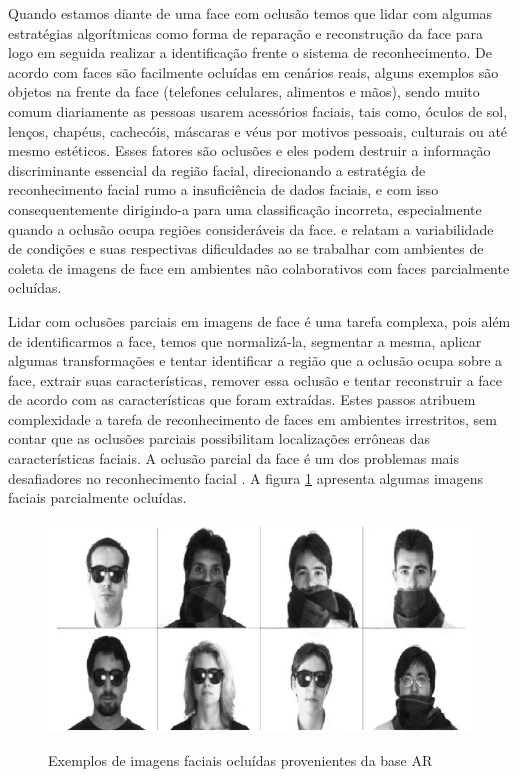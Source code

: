 Quando estamos diante de uma face com oclusão temos que lidar com algumas estratégias algorítmicas como forma de reparação e reconstrução da face para logo em seguida realizar a identificação frente o sistema de reconhecimento. De acordo com  faces são facilmente ocluídas em cenários reais, alguns exemplos são objetos na frente da face (telefones celulares, alimentos e mãos), sendo muito comum diariamente  as pessoas usarem acessórios faciais, tais como, óculos de sol, lenços, chapéus, cachecóis, máscaras e véus por motivos pessoais, culturais ou até mesmo estéticos. Esses fatores são oclusões e eles podem destruir a informação discriminante  essencial da região facial, direcionando a estratégia de reconhecimento facial rumo a insuficiência de dados faciais, e com isso consequentemente dirigindo-a para uma classificação incorreta, especialmente quando a oclusão ocupa regiões consideráveis da face. 
  e  relatam a variabilidade de condições e suas respectivas dificuldades ao se trabalhar com ambientes de coleta de imagens de face em ambientes não colaborativos com faces parcialmente ocluídas.

Lidar com oclusões parciais em imagens de face é uma tarefa complexa, pois além de identificarmos a face, temos que normalizá-la,  segmentar a mesma, aplicar algumas transformações e tentar identificar a região que a oclusão ocupa sobre a face, extrair suas características, remover essa oclusão e tentar reconstruir a face de acordo com as características que foram extraídas. Estes passos atribuem complexidade a tarefa de reconhecimento de faces em ambientes irrestritos, sem contar que as oclusões parciais possibilitam localizações errôneas das características faciais. A oclusão parcial da face é um dos problemas mais desafiadores no reconhecimento facial \cite{ekenel2009facial}. A figura \ref{fig:imgsOcluidas} apresenta algumas imagens faciais parcialmente ocluídas.

\begin{figure}[H]
\centering
\caption{Exemplos de imagens faciais ocluídas provenientes da base AR}
\includegraphics[scale = 0.8]{imgs/imgsOcluidas.png}
\label{fig:imgsOcluidas}
\end{figure}

